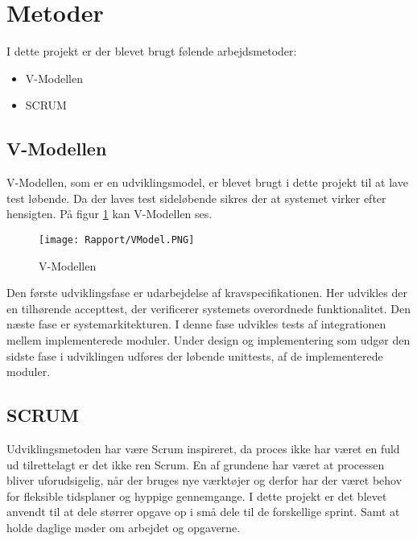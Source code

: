 \section{Metoder}

I dette projekt er der blevet brugt følende arbejdsmetoder:
\begin{itemize}
	\item V-Modellen
	\item SCRUM
	
\end{itemize}

\subsection{V-Modellen}

V-Modellen, som er en udviklingsmodel, er blevet brugt i dette projekt til at lave test løbende. Da der laves test sideløbende sikres der at systemet virker efter hensigten. På figur \ref{VModel} kan V-Modellen ses.

\begin{figure}[H]
	\centering
	\texttt{[image: Rapport/VModel.PNG]}
	\caption{V-Modellen}
	\label{VModel}
\end{figure} 
Den første udviklingsfase er udarbejdelse af kravspecifikationen. Her udvikles der en tilhørende accepttest, der verificerer systemets overordnede funktionalitet. Den næste fase er systemarkitekturen.
I denne fase udvikles tests af integrationen mellem implementerede moduler. Under design og implementering som udgør den sidste fase i udviklingen udføres der løbende unittests, af de implementerede moduler.

\subsection{SCRUM}
Udviklingsmetoden har være Scrum inspireret, da proces ikke har været en fuld ud tilrettelagt er det ikke ren Scrum. En af grundene har været at processen bliver uforudsigelig, når der bruges nye værktøjer og derfor har der været behov for fleksible tidsplaner og hyppige gennemgange. 
\newline
\newline
I dette projekt er det blevet anvendt til at dele størrer opgave op i små dele til de forskellige sprint. Samt at holde daglige møder om arbejdet og opgaverne. 



